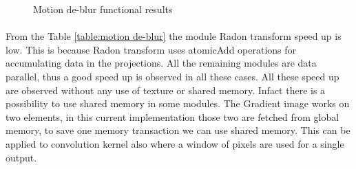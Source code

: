 \begin{table}[htb]
	\centering
		\caption{timing performance of motion de-blur algorithm}
		\label{table:motion de-blur}
	\end{table}
\begin{figure}[htb]
	{\centering
	\qquad
	\caption{Motion de-blur functional results}%
	\label{fig:motion de-blur results}%
}
\end{figure}
\paragraph*{}From the Table \ref{table:motion de-blur} the module Radon transform speed up is low. This is because Radon transform uses atomicAdd operations for accumulating data in the projections. All the remaining modules are data parallel, thus a good speed up is observed in all these cases. All these speed up are observed without any use of texture or shared memory. Infact there is a possibility to use shared memory in some modules. The Gradient image works on two elements, in this current implementation those two are fetched from global memory, to save one memory transaction we can use shared memory. This can be applied to convolution kernel also where a window of pixels are used for a single output.


%
